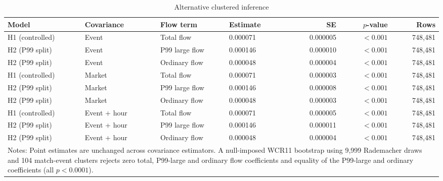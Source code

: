 \begin{table}[htbp]
\centering
\caption{Alternative clustered inference}
\label{tab:appendix-clusters}
\scriptsize
\begin{tabular}{llllrrr}
\hline
Model & Covariance & Flow term & Estimate & SE & $p$-value & Rows \\
\hline
H1 (controlled) & Event & Total flow & 0.000071 & 0.000005 & $<0.001$ & 748,481 \\
H2 (P99 split) & Event & P99 large flow & 0.000146 & 0.000010 & $<0.001$ & 748,481 \\
H2 (P99 split) & Event & Ordinary flow & 0.000048 & 0.000004 & $<0.001$ & 748,481 \\
H1 (controlled) & Market & Total flow & 0.000071 & 0.000003 & $<0.001$ & 748,481 \\
H2 (P99 split) & Market & P99 large flow & 0.000146 & 0.000008 & $<0.001$ & 748,481 \\
H2 (P99 split) & Market & Ordinary flow & 0.000048 & 0.000003 & $<0.001$ & 748,481 \\
H1 (controlled) & Event + hour & Total flow & 0.000071 & 0.000005 & $<0.001$ & 748,481 \\
H2 (P99 split) & Event + hour & P99 large flow & 0.000146 & 0.000011 & $<0.001$ & 748,481 \\
H2 (P99 split) & Event + hour & Ordinary flow & 0.000048 & 0.000004 & $<0.001$ & 748,481 \\
\hline
\multicolumn{7}{p{0.96\textwidth}}{\footnotesize Notes: Point estimates are unchanged across covariance estimators. A null-imposed WCR11 bootstrap using 9,999 Rademacher draws and 104 match-event clusters rejects zero total, P99-large and ordinary flow coefficients and equality of the P99-large and ordinary coefficients (all $p<0.0001$).}
\end{tabular}
\end{table}
